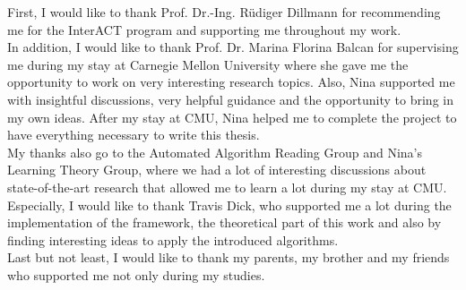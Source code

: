 \acks

First, I would like to thank Prof. Dr.-Ing. R\"{u}diger Dillmann for recommending me for the InterACT program and supporting me throughout my work.\\

In addition, I would like to thank Prof. Dr. Marina Florina Balcan for supervising me during my stay at Carnegie Mellon University where she gave me the opportunity to work on very interesting research topics. Also, Nina supported me with insightful discussions, very helpful guidance and the opportunity to bring in my own ideas. After my stay at CMU, Nina helped me to complete the project to have everything necessary to write this thesis.\\

My thanks also go to the Automated Algorithm Reading Group and Nina's Learning Theory Group, where we had a lot of interesting discussions about state-of-the-art research that allowed me to learn a lot during my stay at CMU. Especially, I would like to thank Travis Dick, who supported me a lot during the implementation of the framework, the theoretical part of this work and also by finding interesting ideas to apply the introduced algorithms.\\

Last but not least, I would like to thank my parents, my brother and my friends who supported me not only during my studies.